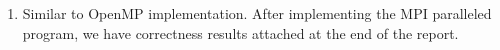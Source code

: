 \documentclass[letterpaper,11pt]{exam}
\begin{document}
\begin{questions}



    \begin{enumerate}[label=\roman*.]
        \item Similar to OpenMP implementation. After implementing the MPI paralleled program, we have correctness results attached at the end of the report.



\end{enumerate}
\end{questions}
\end{document}
